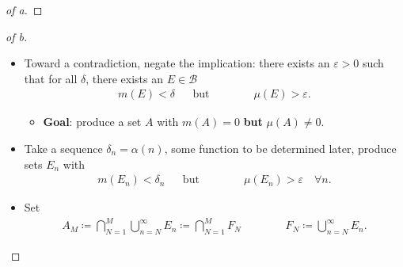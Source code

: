 \begin{solution}
\begin{proof}[of a]
\end{proof}

\begin{proof}[of b]

\envlist

\begin{itemize}
\item
  Toward a contradiction, negate the implication: there exists an
  \({\varepsilon}>0\) such that for all \(\delta\), there exists an
  \(E\in \mathcal{B}\)
  \begin{align*}
  m(E) < \delta && \text{but} \hspace{4em} \mu(E) > {\varepsilon}
  .\end{align*}

  \begin{itemize}
  \tightlist
  \item
    \textbf{Goal}: produce a set \(A\) with \(m(A)= 0\) \textbf{but}
    \(\mu(A)\neq 0\).
  \end{itemize}
\item
  Take a sequence \(\delta_n = \alpha(n)\), some function to be
  determined later, produce sets \(E_n\) with
  \begin{align*}
  m(E_n) < \delta_n && \text{but} \hspace{4em} \mu(E_n) > {\varepsilon}\quad \forall n
  .\end{align*}
\item
  Set
  \begin{align*}
  A_M \coloneqq\displaystyle\bigcap_{N=1}^M \displaystyle\bigcup_{n=N}^\infty E_n \coloneqq\displaystyle\bigcap_{N=1}^M F_N
  \hspace{4em} 
  F_N \coloneqq\displaystyle\bigcup_{n=N}^\infty E_n
  .\end{align*}


\end{itemize}
\end{proof}
\end{solution}
